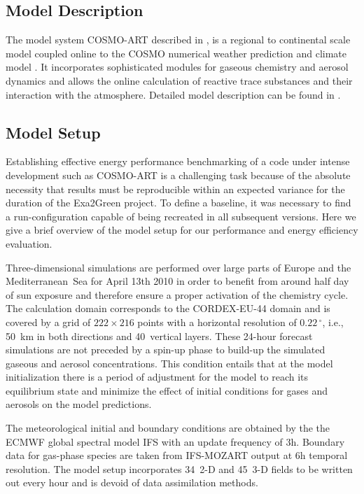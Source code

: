 \subsection{Model Description}
\label{subsec:1.1}
The  model  system COSMO-ART  described  in  \citep{Vogel-2009}, is  a
regional  to  continental scale  model  coupled  online  to the  COSMO
numerical weather  prediction and climate  model \citep{Baldauf-2011}.
It  incorporates  sophisticated  modules  for  gaseous  chemistry  and
aerosol dynamics  and allows the online calculation  of reactive trace
substances and their interaction  with the atmosphere.  Detailed model
description   can  be   found   in  \citep{Bangert-2012,   Knote-2011,
  Knote-2013}.

\subsection{Model Setup}
\label{subsec:1.2}
Establishing effective energy performance benchmarking of a code under
intense development such as COSMO-ART is a challenging task because of
the  absolute necessity that  results must  be reproducible  within an
expected variance for the duration of the Exa2Green project. To define
a baseline,  it was necessary  to find a run-configuration  capable of
being  recreated in  all subsequent  versions.  Here  we give  a brief
overview of the model setup  for our performance and energy efficiency
evaluation.

Three-dimensional simulations are performed over large parts of Europe
and the Mediterranean~Sea for April 13th 2010 in order to benefit from
around  half  day  of  sun  exposure and  therefore  ensure  a  proper
activation of the chemistry cycle.  The calculation domain corresponds
to the CORDEX-EU-44 domain and is covered by a grid of $222\times 216$
points with  a horizontal resolution of  $0.22\,^{\circ}$, i.e., 50~km
in  both directions  and 40~vertical  layers.  These  24-hour forecast
simulations  are not  preceded  by  a spin-up  phase  to build-up  the
simulated gaseous and  aerosol concentrations.  This condition entails
that at the  model initialization there is a  period of adjustment for
the model  to reach its equilibrium  state and minimize  the effect of
initial conditions for gases and aerosols on the model predictions.

The meteorological initial and boundary conditions are obtained by the
the ECMWF  global spectral model IFS  with an update  frequency of 3h.
Boundary data  for gas-phase species are taken  from IFS-MOZART output
at  6h temporal resolution.  The model  setup incorporates  34~2-D and
45~3-D  fields to  be written  out every  hour and  is devoid  of data
assimilation methods.

